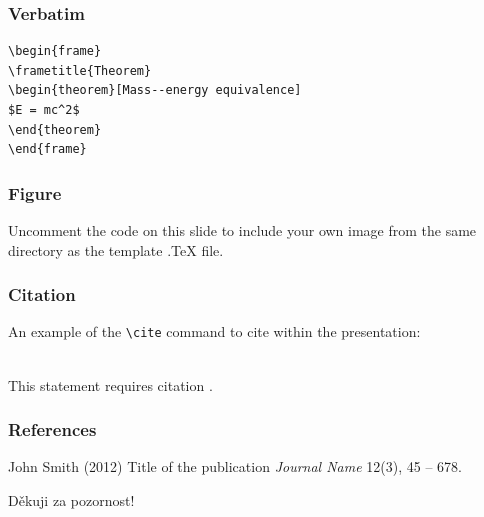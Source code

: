 \documentclass[mathserif]{beamer}
\begin{document}

\begin{frame}[fragile] %
\frametitle{Verbatim}
\begin{example}
\begin{verbatim}
\begin{frame}
\frametitle{Theorem}
\begin{theorem}[Mass--energy equivalence]
$E = mc^2$
\end{theorem}
\end{frame}\end{verbatim}
\end{example}
\end{frame}


\begin{frame}
\frametitle{Figure}
Uncomment the code on this slide to include your own image from the same directory as the template .TeX file.
\end{frame}


\begin{frame}[fragile] %
\frametitle{Citation}
An example of the \verb|\cite| command to cite within the presentation:\\~

This statement requires citation \cite{p1}.
\end{frame}


\begin{frame}
\frametitle{References}
\footnotesize{
\begin{thebibliography}{99} %
 John Smith (2012)
\newblock Title of the publication
\newblock \emph{Journal Name} 12(3), 45 -- 678.
\end{thebibliography}
}
\end{frame}


\begin{frame}
\Huge{\centerline{Děkuji za pozornost!}}
\end{frame}

\end{document}
